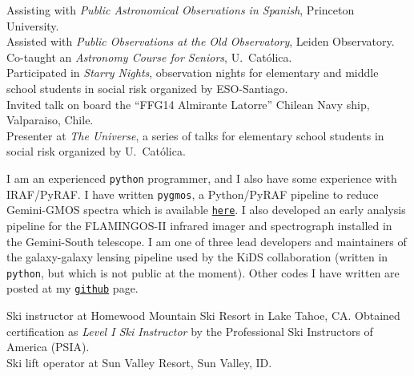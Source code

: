 \documentclass[11pt]{article}
\begin{document}

\noindent
{} Assisting with \emph{Public Astronomical Observations in Spanish}, Princeton University.\\
 Assisted with \emph{Public Observations at the Old Observatory}, Leiden Observatory.\\
 Co-taught an \emph{Astronomy Course for Seniors}, U.\ Cat\'olica.\\
 Participated in \emph{Starry Nights}, observation nights for elementary and middle school students in social risk organized by ESO-Santiago.\\
 Invited talk on board the ``FFG14 Almirante Latorre'' Chilean Navy ship, Valparaiso, Chile.\\
 Presenter at \emph{The Universe}, a series of talks for elementary school students in social risk organized by U.\ Cat\'olica.\\



I am an experienced \texttt{python} programmer, and I also have some experience with IRAF/PyRAF. I have written {\tt pygmos}, a Python/PyRAF pipeline to reduce Gemini-GMOS spectra which is available \href{https://github.com/cristobal-sifon/pygmos/}{\texttt{here}}. I also developed an early analysis pipeline for the FLAMINGOS-II infrared imager and spectrograph installed in the Gemini-South telescope. I am one of three lead developers and maintainers of the galaxy-galaxy lensing pipeline used by the KiDS collaboration (written in \texttt{python}, but which is not public at the moment). Other codes I have written are posted at my \href{https://github.com/cristobal-sifon}{\texttt{github}} page.\\



\noindent
{} Ski instructor at Homewood Mountain Ski Resort in Lake Tahoe, CA. Obtained certification as \emph{Level I Ski Instructor} by the Professional Ski Instructors of America (PSIA).\\
 Ski lift operator at Sun Valley Resort, Sun Valley, ID.\\

\hline
\vspace{0.5cm}

\pagebreak
\end{document}
